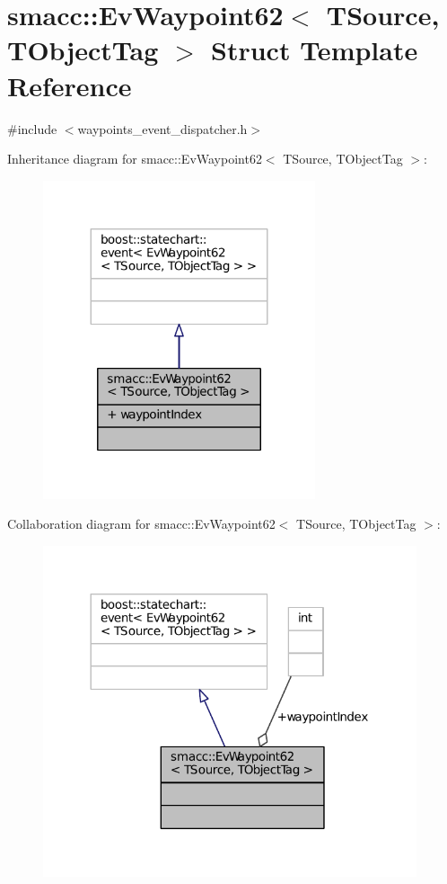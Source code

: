 \hypertarget{structsmacc_1_1EvWaypoint62}{}\section{smacc\+:\+:Ev\+Waypoint62$<$ T\+Source, T\+Object\+Tag $>$ Struct Template Reference}
\label{structsmacc_1_1EvWaypoint62}


{\ttfamily \#include $<$waypoints\+\_\+event\+\_\+dispatcher.\+h$>$}



Inheritance diagram for smacc\+:\+:Ev\+Waypoint62$<$ T\+Source, T\+Object\+Tag $>$\+:
\nopagebreak
\begin{figure}[H]
\begin{center}
\leavevmode
\includegraphics[width=227pt]{structsmacc_1_1EvWaypoint62__inherit__graph}
\end{center}
\end{figure}


Collaboration diagram for smacc\+:\+:Ev\+Waypoint62$<$ T\+Source, T\+Object\+Tag $>$\+:
\nopagebreak
\begin{figure}[H]
\begin{center}
\leavevmode
\includegraphics[width=312pt]{structsmacc_1_1EvWaypoint62__coll__graph}
\end{center}
\end{figure}

